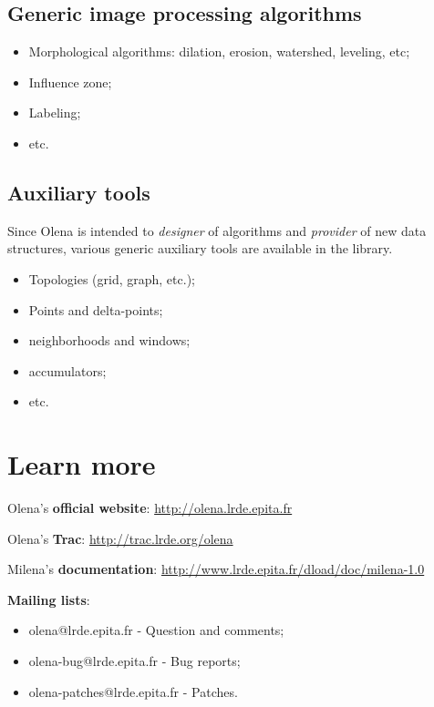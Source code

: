 \documentclass{article}
\begin{document}
\subsection{Generic image processing algorithms}

\begin{itemize}
  \item Morphological algorithms: dilation, erosion, watershed, leveling, etc;
  \item Influence zone;
  \item Labeling;
  \item etc.
\end{itemize}

\subsection{Auxiliary tools}

Since Olena is intended to \textit{designer} of algorithms and \textit{provider}
of new data structures, various generic auxiliary tools are available in the
library.

\begin{itemize}
  \item Topologies (grid, graph, etc.);
  \item Points and delta-points;
  \item neighborhoods and windows;
  \item accumulators;
  \item etc.
\end{itemize}



\section{Learn more}

Olena's \textbf{official website}: \url{http://olena.lrde.epita.fr}

Olena's \textbf{Trac}: \url{http://trac.lrde.org/olena}

Milena's \textbf{documentation}:
\url{http://www.lrde.epita.fr/dload/doc/milena-1.0}

%
\medskip
%

\textbf{Mailing lists}:
\begin{itemize}
  \item olena@lrde.epita.fr - Question and comments;
  \item olena-bug@lrde.epita.fr - Bug reports;
  \item olena-patches@lrde.epita.fr - Patches.
\end {itemize}
\end{document}
